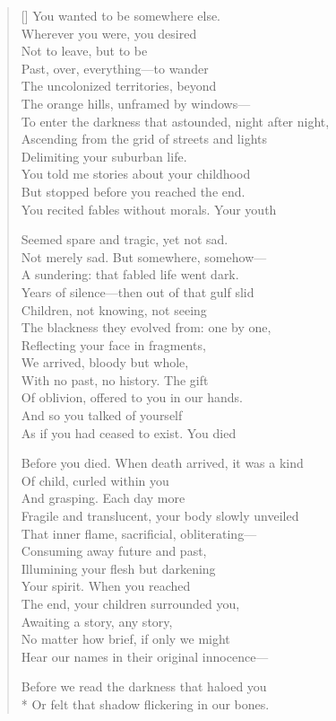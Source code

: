 \label{ch:deathinlife}
\settowidth{\versewidth}{To enter the darkness that astounded, night after night,}
\begin{verse}[\versewidth]
You wanted to be somewhere else.\\
Wherever you were, you desired\\
Not to leave, but to be\\
Past, over, everything---to wander\\
The uncolonized territories, beyond \\
The orange hills, unframed by windows---\\
To enter the darkness that astounded, night after night,\\
Ascending from the grid of streets and lights\\
Delimiting your suburban life.\\
You told me stories about your childhood\\
But stopped before you reached the end.\\
You recited fables without morals.  Your youth

Seemed spare and tragic, yet not sad.\\
Not merely sad.  But somewhere, somehow---\\
A sundering: that fabled life went dark.\\
Years of silence---then out of that gulf slid\\
Children, not knowing, not seeing\\
The blackness they evolved from: one by one,\\
Reflecting your face in fragments,\\
We arrived, bloody but whole,\\
With no past, no history.  The gift\\
Of oblivion, offered to you in our hands.\\
And so you talked of yourself\\
As if you had ceased to exist.	You died

Before you died.   When death arrived, it was a kind\\
Of child, curled within you\\
And grasping.   Each day more\\
Fragile and translucent, your body slowly unveiled\\
That inner flame, sacrificial, obliterating---\\
Consuming away future and past, \\
Illumining your flesh but darkening\\
Your spirit. When you reached\\
The end, your children surrounded you,\\
Awaiting a story, any story,\\
No matter how brief, if only we might\\
Hear our names in their original innocence---

Before we read the darkness that haloed you\\*
Or felt that shadow flickering in our bones.
\end{verse}

